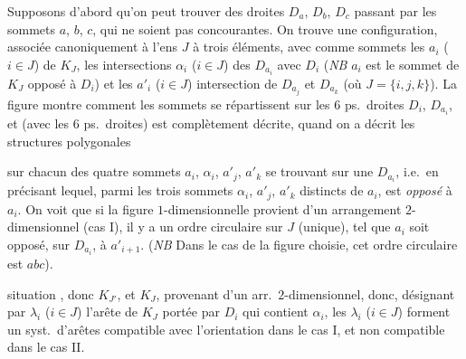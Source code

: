 \documentclass[11pt,a4paper]{article}
\begin{document}
Supposons d'abord qu'on peut trouver des droites $D_a$, $D_b$, $D_c$ passant par les sommets $a$, $b$, $c$, qui ne soient pas concourantes. On trouve une configuration, associée canoniquement à l'ens $J$ à trois éléments, avec comme  sommets les $a_i$ ($i \in J$) de $K_J$, les intersections $\alpha_i$ ($i \in J$) des $D_{a_i}$ avec $D_i$ (\emph{NB} $a_i$ est le sommet de $K_J$ opposé à $D_i$) et les $a'_i$ ($i \in J$) intersection de $D_{a_j}$ et $D_{a_k}$ (où $J = \lbrace i, j, k \rbrace$). \struck{\ill{}} La figure montre comment les sommets se répartissent sur les $6$ ps.\ droites $D_i$, $D_{a_i}$, et   (avec les $6$ ps.\ droites) est complètement décrite, quand on a décrit les structures polygonales

sur chacun des quatre sommets $a_i$, $\alpha_i$, $a'_j$, $a'_k$ \struck{\ill{}} se trouvant sur une $D_{a_i}$, i.e.\ en \struck{\ill{}} précisant lequel, parmi les trois sommets $\alpha_i$, $a'_j$, $a'_k$ distincts de $a_i$, est \emph{opposé} à $a_i$. On voit que si la figure $1$-dimensionnelle provient d'un arrangement $2$-dimensionnel (cas I), il y a un ordre circulaire sur $J$ (unique), tel que $a_i$ soit opposé, sur $D_{a_i}$, à $a'_{i+1}$. (\emph{NB} Dans le cas de la figure choisie, cet ordre circulaire est $abc$).

  \ill{} situation , donc  $K_{J'}$, \struck{\ill{}} et $K_J$, provenant d'un arr.\ $2$-dimensionnel, donc,  désignant par $\lambda_i$ ($i \in J$)  l'arête de $K_J$  portée par $D_i$ qui contient $\alpha_i$, les $\lambda_i$ ($i \in J$) forment un syst.\ d'arêtes compatible avec l'orientation dans le cas I, et non compatible dans le cas II.
\end{document}
